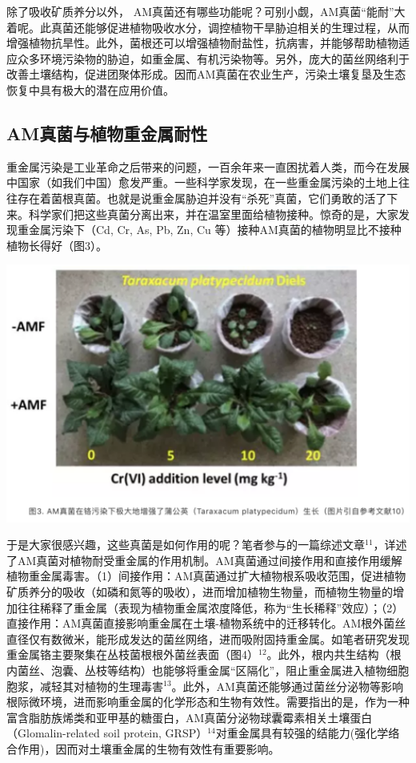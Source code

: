 \documentclass[]{book}
\begin{document}
除了吸收矿质养分以外，
AM真菌还有哪些功能呢？可别小觑，AM真菌``能耐''大着呢。此真菌还能够促进植物吸收水分，调控植物干旱胁迫相关的生理过程，从而增强植物抗旱性。此外，菌根还可以增强植物耐盐性，抗病害，并能够帮助植物适应众多环境污染物的胁迫，如重金属、有机污染物等。另外，庞大的菌丝网络利于改善土壤结构，促进团聚体形成。因而AM真菌在农业生产，污染土壤复垦及生态恢复中具有极大的潜在应用价值。

\subsection{AM真菌与植物重金属耐性}\label{am}

重金属污染是工业革命之后带来的问题，一百余年来一直困扰着人类，而今在发展中国家（如我们中国）愈发严重。一些科学家发现，在一些重金属污染的土地上往往存在着菌根真菌。也就是说重金属胁迫并没有``杀死''真菌，它们勇敢的活了下来。科学家们把这些真菌分离出来，并在温室里面给植物接种。惊奇的是，大家发现重金属污染下（Cd,
Cr, As, Pb, Zn, Cu 等）接种AM真菌的植物明显比不接种植物长得好（图3）。

\includegraphics[width=6.67in]{images/am3}

于是大家很感兴趣，这些真菌是如何作用的呢？笔者参与的一篇综述文章\(^{11}\)，详述了AM真菌对植物耐受重金属的作用机制。AM真菌通过间接作用和直接作用缓解植物重金属毒害。（1）间接作用：AM真菌通过扩大植物根系吸收范围，促进植物矿质养分的吸收（如磷和氮等的吸收），进而增加植物生物量，而植物生物量的增加往往稀释了重金属（表现为植物重金属浓度降低，称为``生长稀释''效应）；（2）直接作用：AM真菌直接影响重金属在土壤-植物系统中的迁移转化。AM根外菌丝直径仅有数微米，能形成发达的菌丝网络，进而吸附固持重金属。如笔者研究发现重金属铬主要聚集在丛枝菌根根外菌丝表面（图4）\(^{12}\)。此外，根内共生结构（根内菌丝、泡囊、丛枝等结构）也能够将重金属``区隔化''，阻止重金属进入植物细胞胞浆，减轻其对植物的生理毒害\(^{13}\)。此外，AM真菌还能够通过菌丝分泌物等影响根际微环境，进而影响重金属的化学形态和生物有效性。需要指出的是，作为一种富含脂肪族烯类和亚甲基的糖蛋白，AM真菌分泌物球囊霉素相关土壤蛋白（Glomalin-related
soil protein,
GRSP）\(^{14}\)对重金属具有较强的结能力(强化学络合作用)，因而对土壤重金属的生物有效性有重要影响。
\end{document}
